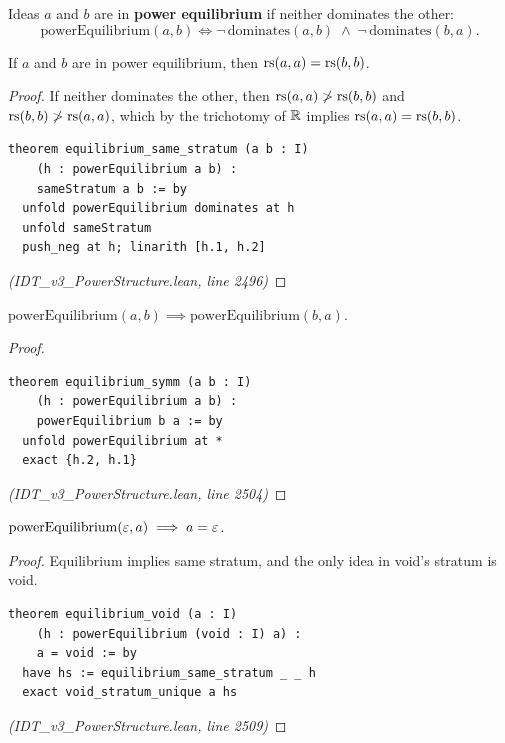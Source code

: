 \begin{definition}
\label{def:power-equilibrium}
Ideas $a$ and $b$ are in \textbf{power equilibrium} if neither dominates
the other:
\[
  \mathrm{powerEquilibrium}(a, b) \iff \neg\,\mathrm{dominates}(a,b) \;\land\; \neg\,\mathrm{dominates}(b,a).
\]
\end{definition}

\begin{theorem}
\label{thm:equilibrium-stratum}
If $a$ and $b$ are in power equilibrium, then $\mathrm{rs}(a,a) = \mathrm{rs}(b,b)$.
\end{theorem}

\begin{proof}
If neither dominates the other, then $\mathrm{rs}(a,a) \not> \mathrm{rs}(b,b)$ and
$\mathrm{rs}(b,b) \not> \mathrm{rs}(a,a)$, which by the trichotomy of $\mathbb{R}$ implies
$\mathrm{rs}(a,a) = \mathrm{rs}(b,b)$.
\begin{lstlisting}
theorem equilibrium_same_stratum (a b : I)
    (h : powerEquilibrium a b) :
    sameStratum a b := by
  unfold powerEquilibrium dominates at h
  unfold sameStratum
  push_neg at h; linarith [h.1, h.2]
\end{lstlisting}
\textit{(IDT\_v3\_PowerStructure.lean, line 2496)}
\end{proof}

\begin{theorem}
\label{thm:equilibrium-symm}
$\mathrm{powerEquilibrium}(a, b) \implies \mathrm{powerEquilibrium}(b, a)$.
\end{theorem}

\begin{proof}
\begin{lstlisting}
theorem equilibrium_symm (a b : I)
    (h : powerEquilibrium a b) :
    powerEquilibrium b a := by
  unfold powerEquilibrium at *
  exact {h.2, h.1}
\end{lstlisting}
\textit{(IDT\_v3\_PowerStructure.lean, line 2504)}
\end{proof}

\begin{theorem}
\label{thm:equilibrium-void}
$\mathrm{powerEquilibrium}(\varepsilon, a) \implies a = \varepsilon$.
\end{theorem}

\begin{proof}
Equilibrium implies same stratum, and the only idea in void's stratum is void.
\begin{lstlisting}
theorem equilibrium_void (a : I)
    (h : powerEquilibrium (void : I) a) :
    a = void := by
  have hs := equilibrium_same_stratum _ _ h
  exact void_stratum_unique a hs
\end{lstlisting}
\textit{(IDT\_v3\_PowerStructure.lean, line 2509)}
\end{proof}

